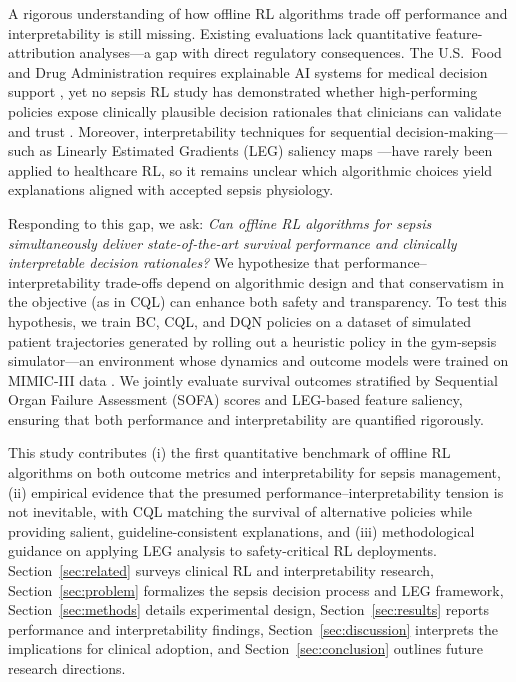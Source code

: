 A rigorous understanding of how offline RL algorithms trade off performance and interpretability is still missing. Existing evaluations lack quantitative feature-attribution analyses—a gap with direct regulatory consequences. The U.S.\ Food and Drug Administration requires explainable AI systems for medical decision support \citep{fda2021ai}, yet no sepsis RL study has demonstrated whether high-performing policies expose clinically plausible decision rationales that clinicians can validate and trust \citep{holzinger2017xai_healthcare}. Moreover, interpretability techniques for sequential decision-making—such as Linearly Estimated Gradients (LEG) saliency maps \citep{greydanus2018leg}—have rarely been applied to healthcare RL, so it remains unclear which algorithmic choices yield explanations aligned with accepted sepsis physiology.

Responding to this gap, we ask: \textit{Can offline RL algorithms for sepsis simultaneously deliver state-of-the-art survival performance and clinically interpretable decision rationales?} We hypothesize that performance--interpretability trade-offs depend on algorithmic design and that conservatism in the objective (as in CQL) can enhance both safety and transparency. To test this hypothesis, we train BC, CQL, and DQN policies on a dataset of simulated patient trajectories generated by rolling out a heuristic policy in the gym-sepsis simulator—an environment whose dynamics and outcome models were trained on MIMIC-III data \citep{raghu2017sepsis_drl}. We jointly evaluate survival outcomes stratified by Sequential Organ Failure Assessment (SOFA) scores and LEG-based feature saliency, ensuring that both performance and interpretability are quantified rigorously.

This study contributes (i) the first quantitative benchmark of offline RL algorithms on both outcome metrics and interpretability for sepsis management, (ii) empirical evidence that the presumed performance--interpretability tension is not inevitable, with CQL matching the survival of alternative policies while providing salient, guideline-consistent explanations, and (iii) methodological guidance on applying LEG analysis to safety-critical RL deployments. Section~\ref{sec:related} surveys clinical RL and interpretability research, Section~\ref{sec:problem} formalizes the sepsis decision process and LEG framework, Section~\ref{sec:methods} details experimental design, Section~\ref{sec:results} reports performance and interpretability findings, Section~\ref{sec:discussion} interprets the implications for clinical adoption, and Section~\ref{sec:conclusion} outlines future research directions.

